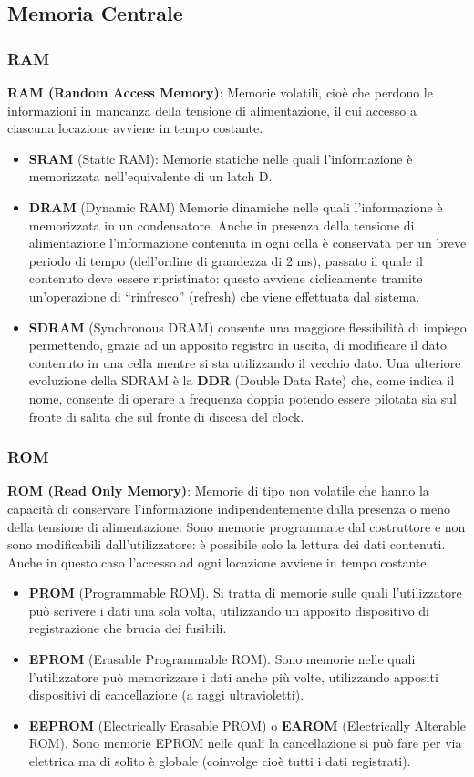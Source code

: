 \documentclass[12pt]{article} %
\begin{document}
\subsection{Memoria Centrale}
\subsubsection{RAM}
\textbf{RAM (Random Access Memory)}: Memorie volatili, cioè che perdono le informazioni in mancanza della tensione di alimentazione, il cui accesso a ciascuna locazione avviene in tempo costante.
\begin{itemize}
    \item \textbf{SRAM} (Static RAM): Memorie statiche nelle quali l’informazione è memorizzata nell’equivalente di un latch D.
    \item  \textbf{DRAM} (Dynamic RAM) Memorie dinamiche nelle quali l’informazione è memorizzata in un condensatore. Anche in presenza della tensione di alimentazione l’informazione contenuta in ogni cella è conservata per un breve periodo di tempo (dell’ordine di grandezza di 2 ms), passato il quale il contenuto deve essere ripristinato: questo avviene ciclicamente tramite un’operazione di “rinfresco” (refresh) che viene effettuata dal sistema.
    \item \textbf{SDRAM} (Synchronous DRAM) consente una maggiore flessibilità di impiego permettendo, grazie ad un apposito registro in uscita, di modificare il dato contenuto in una cella mentre si sta utilizzando il vecchio dato. Una ulteriore evoluzione della SDRAM è la \textbf{DDR} (Double Data Rate) che, come indica il nome, consente di operare a frequenza doppia potendo essere pilotata sia sul fronte di salita che sul fronte di discesa del clock.
\end{itemize}

\subsubsection{ROM}
\textbf{ROM (Read Only Memory)}: Memorie di tipo non volatile che hanno la capacità di conservare l’informazione indipendentemente dalla presenza o meno della tensione di alimentazione. Sono memorie programmate dal costruttore e non sono modificabili dall’utilizzatore: è possibile solo la lettura dei dati contenuti. Anche in questo caso l’accesso ad ogni locazione avviene in tempo costante.
\begin{itemize}
    \item  \textbf{PROM} (Programmable ROM). Si tratta di memorie sulle quali l’utilizzatore può scrivere i dati una sola volta, utilizzando un apposito dispositivo di registrazione che brucia dei fusibili.
    \item \textbf{EPROM} (Erasable Programmable ROM). Sono memorie nelle quali l’utilizzatore può memorizzare i dati anche più volte, utilizzando appositi dispositivi di cancellazione (a raggi ultravioletti).
    \item \textbf{EEPROM} (Electrically Erasable PROM) o \textbf{EAROM} (Electrically Alterable ROM). Sono memorie EPROM nelle quali la cancellazione si può fare per via elettrica ma di solito è globale (coinvolge cioè tutti i dati registrati).\par\medskip\noindent
\end{itemize}
\end{document}

